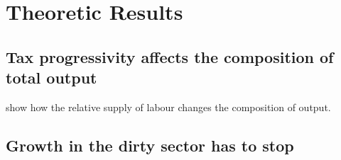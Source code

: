 \section{Theoretic Results}

\subsection{Tax progressivity affects the composition of total output}
show how the relative supply of labour changes the composition of output.
\subsection{Growth in the dirty sector has to stop}